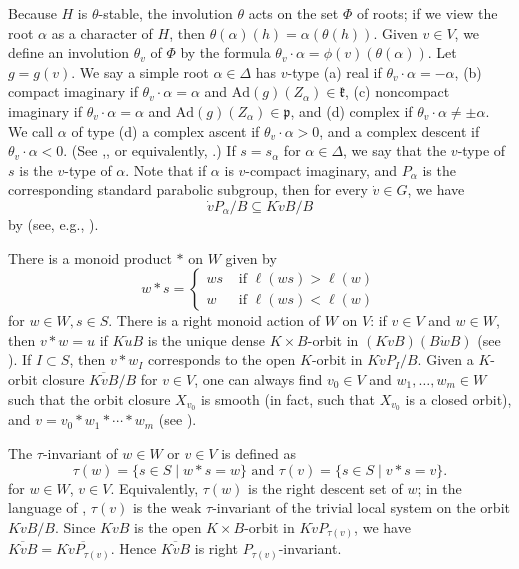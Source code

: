 \documentclass[11pt,letterpaper,reqno]{amsart}
\numberwithin{equation}{section}
\theoremstyle{plain}
\theoremstyle{definition}
\theoremstyle{remark}
\newcommand{\Ad}{\mathrm{Ad}}
\begin{document}
Because $H$ is $\theta$-stable, the involution $\theta$ acts on the set $\Phi$ of roots; if we view the root $\alpha$ as a character of $H$, then
$\theta(\alpha)(h) = \alpha(\theta(h))$.
Given $v \in V$, we define an involution $\theta_v$ of $\Phi$ by the formula $\theta_v\cdot\alpha = \phi(v) \left(\theta(\alpha)\right)$.  
Let $g = g(v)$. 
We say a simple root $\alpha \in \Delta$ has $v$-type (a) real if $\theta_v\cdot\alpha=-\alpha$, (b) compact imaginary if $\theta_v\cdot\alpha=\alpha$ and $\Ad(g)(Z_\alpha) \in\mathfrak{k}$, (c) noncompact imaginary if $\theta_v\cdot\alpha=\alpha$ and $\Ad(g)(Z_\alpha) \in\mathfrak{p}$, and (d) complex if $\theta_v\cdot\alpha\neq\pm\alpha$. 
We call $\alpha$ of type (d) 
a complex ascent if $\theta_v\cdot\alpha>0$, and a complex descent if $\theta_v\cdot\alpha<0$. (See \cite[Definition 2.5]{Vog3},\cite[\S2.4]{RS93}, or equivalently, 
\cite{Springer1985}.)  If $s = s_{\alpha}$ for $\alpha \in \Delta$, we say that the $v$-type of $s$ is the $v$-type of $\alpha$.  Note that if $\alpha$ is $v$-compact
imaginary, and $P_\alpha$ is the corresponding standard parabolic subgroup, then for every $\dot{v} \in G$, we have
\begin{equation} \label{e:compact-imag}
\dot{v} P_{\alpha}/B \subseteq K \dot{v} B/B
\end{equation}
by \cite[Lemma 5.1]{Vog3} (see, e.g., \cite[2.4]{RS93}).

There is a monoid product $*$ on $W$ given by
$$
w*s = \begin{cases}
ws & \mbox{ if } \ell(ws) > \ell(w) \\
w & \mbox{ if } \ell(ws) < \ell(w)
\end{cases}
$$
for $w \in W, s \in S$.
There is a right monoid action of $W$ on $V$: if $v \in V$ and $w \in W$, then $v*w = u$ if
$K \dot{u} B$ is the unique dense $K \times B$-orbit in $(K \dot{v} B)(B \dot{w} B)$
(see  \cite{RS93}).  If $I \subset S$, then $v*w_I$ corresponds to the open $K$-orbit in $K \dot{v} P_I/B$.
Given a $K$-orbit closure $\overline{K\dot{v}B}/B$ for $v\in V$, one can always find $v_0\in V$ and $w_1,\ldots,w_m\in W$ such that 
the orbit closure $X_{v_0}$ is smooth (in fact, such that $X_{v_0}$ is a closed orbit), and $v=v_0*w_1*\cdots*w_m$ (see \cite[Theorem 4.6]{RS90}).


The $\tau$-invariant of $w \in W$ or $v \in V$ is defined as
\[
\tau(w) =  \{s \in S \;|\;w*s=w\} \mbox{   and   }   \tau(v)=\{s \in S \;|\;v*s=v\}.
\]
for $w \in W$, $v \in V$.  Equivalently, 
$\tau(w)$ is the right descent set of $w$; in the language of \cite{Vog3}, $\tau(v)$ is the weak $\tau$-invariant of the trivial local system on the orbit $K \dot{v} B/B$.
Since
 $K\dot{v}B$ is the open $K \times B$-orbit
in $K \dot{v} P_{\tau(v)}$, we have
$\overline{K \dot{v} B} = \overline{K \dot{v} P_{\tau(v)}}$.  
Hence $\overline{K \dot{v} B}$ is right $P_{\tau(v)}$-invariant.
\end{document}

